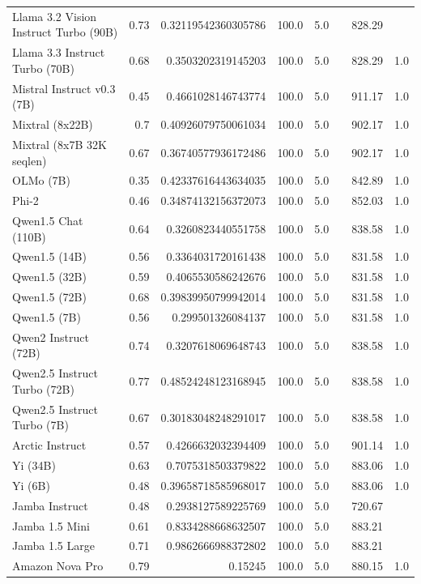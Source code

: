 \begin{table}[htp]
{\begin{tabular}{lrrrrrrr}
Llama 3.2 Vision Instruct Turbo (90B) & 0.73 & 0.32119542360305786 & 100.0 & 5.0 &  & 828.29 &  \\
Llama 3.3 Instruct Turbo (70B) & 0.68 & 0.3503202319145203 & 100.0 & 5.0 &  & 828.29 & 1.0 \\
Mistral Instruct v0.3 (7B) & 0.45 & 0.4661028146743774 & 100.0 & 5.0 &  & 911.17 & 1.0 \\
Mixtral (8x22B) & 0.7 & 0.40926079750061034 & 100.0 & 5.0 &  & 902.17 & 1.0 \\
Mixtral (8x7B 32K seqlen) & 0.67 & 0.36740577936172486 & 100.0 & 5.0 &  & 902.17 & 1.0 \\
OLMo (7B) & 0.35 & 0.42337616443634035 & 100.0 & 5.0 &  & 842.89 & 1.0 \\
Phi-2 & 0.46 & 0.34874132156372073 & 100.0 & 5.0 &  & 852.03 & 1.0 \\
Qwen1.5 Chat (110B) & 0.64 & 0.3260823440551758 & 100.0 & 5.0 &  & 838.58 & 1.0 \\
Qwen1.5 (14B) & 0.56 & 0.3364031720161438 & 100.0 & 5.0 &  & 831.58 & 1.0 \\
Qwen1.5 (32B) & 0.59 & 0.4065530586242676 & 100.0 & 5.0 &  & 831.58 & 1.0 \\
Qwen1.5 (72B) & 0.68 & 0.39839950799942014 & 100.0 & 5.0 &  & 831.58 & 1.0 \\
Qwen1.5 (7B) & 0.56 & 0.299501326084137 & 100.0 & 5.0 &  & 831.58 & 1.0 \\
Qwen2 Instruct (72B) & 0.74 & 0.3207618069648743 & 100.0 & 5.0 &  & 838.58 & 1.0 \\
Qwen2.5 Instruct Turbo (72B) & 0.77 & 0.48524248123168945 & 100.0 & 5.0 &  & 838.58 & 1.0 \\
Qwen2.5 Instruct Turbo (7B) & 0.67 & 0.30183048248291017 & 100.0 & 5.0 &  & 838.58 & 1.0 \\
Arctic Instruct & 0.57 & 0.4266632032394409 & 100.0 & 5.0 &  & 901.14 & 1.0 \\
Yi (34B) & 0.63 & 0.7075318503379822 & 100.0 & 5.0 &  & 883.06 & 1.0 \\
Yi (6B) & 0.48 & 0.39658718585968017 & 100.0 & 5.0 &  & 883.06 & 1.0 \\
Jamba Instruct & 0.48 & 0.2938127589225769 & 100.0 & 5.0 &  & 720.67 &  \\
Jamba 1.5 Mini & 0.61 & 0.8334288668632507 & 100.0 & 5.0 &  & 883.21 &  \\
Jamba 1.5 Large & 0.71 & 0.9862666988372802 & 100.0 & 5.0 &  & 883.21 &  \\
Amazon Nova Pro & 0.79 & 0.15245 & 100.0 & 5.0 &  & 880.15 & 1.0 \\

\end{tabular}}
\end{table}
